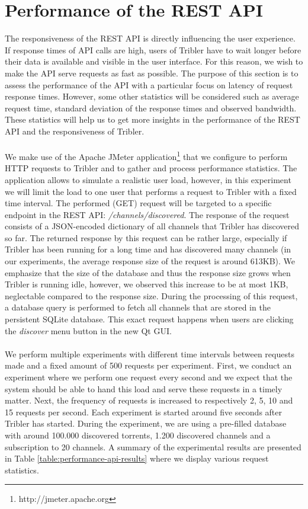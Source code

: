 \section{Performance of the REST API}
The responsiveness of the REST API is directly influencing the user experience. If response times of API calls are high, users of Tribler have to wait longer before their data is available and visible in the user interface. For this reason, we wish to make the API serve requests as fast as possible. The purpose of this section is to assess the performance of the API with a particular focus on latency of request response times. However, some other statistics will be considered such as average request time, standard deviation of the response times and observed bandwidth. These statistics will help us to get more insights in the performance of the REST API and the responsiveness of Tribler.\\\\
We make use of the Apache JMeter application\footnote{http://jmeter.apache.org} that we configure to perform HTTP requests to Tribler and to gather and process performance statistics. The application allows to simulate a realistic user load, however, in this experiment we will limit the load to one user that performs a request to Tribler with a fixed time interval. The performed (GET) request will be targeted to a specific endpoint in the REST API: \emph{/channels/discovered}. The response of the request consists of a JSON-encoded dictionary of all channels that Tribler has discovered so far. The returned response by this request can be rather large, especially if Tribler has been running for a long time and has discovered many channels (in our experiments, the average response size of the request is around 613KB). We emphasize that the size of the database and thus the response size grows when Tribler is running idle, however, we observed this increase to be at most 1KB, neglectable compared to the response size. During the processing of this request, a database query is performed to fetch all channels that are stored in the persistent SQLite database. This exact request happens when users are clicking the \emph{discover} menu button in the new Qt GUI.\\\\
We perform multiple experiments with different time intervals between requests made and a fixed amount of 500 requests per experiment. First, we conduct an experiment where we perform one request every second and we expect that the system should be able to hand this load and serve these requests in a timely matter. Next, the frequency of requests is increased to respectively 2, 5, 10 and 15 requests per second. Each experiment is started around five seconds after Tribler has started. During the experiment, we are using a pre-filled database with around 100.000 discovered torrents, 1.200 discovered channels and a subscription to 20 channels. A summary of the experimental results are presented in Table \ref{table:performance-api-results} where we display various request statistics.\\

